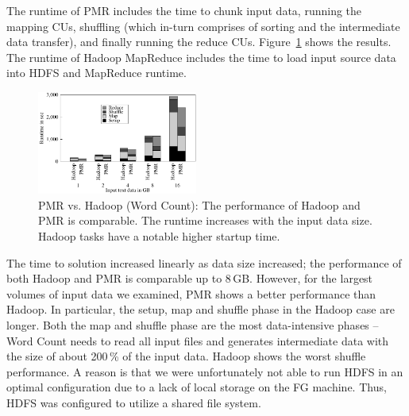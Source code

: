 \documentclass{acm_proc_article-sp}
\newcommand{\jhanote}[1]{ {\textcolor{red} { ***SJ: #1 }}}
\newcommand{\alnote}[1]{ {\textcolor{blue} { ***andreL: #1 }}}
\newcommand{\pnote}[1]{ {\textcolor{magenta} { ***pradeep: #1 }}}
\newcommand{\alnote}[1]{}
\newcommand{\pnote}[1]{}
\newcommand{\jhanote}[1]{}
\newcommand{\upp}{\vspace*{-0.5em}}
\begin{document}
The runtime of PMR includes the time to chunk input data, running the
mapping CUs, shuffling (which in-turn comprises of sorting and the
intermediate data transfer), and finally running the reduce CUs.
Figure~\ref{fig:figures_wc_pmr_hmr} shows the results. The runtime of
Hadoop MapReduce includes the time to load input source data into HDFS and
MapReduce runtime.

\begin{figure}[ht]
	\centering
		\includegraphics[width=0.47\textwidth]{figures/wc_pmr_hmr.pdf}
                \caption{PMR vs. Hadoop (Word Count): The performance
                  of Hadoop and PMR is comparable. The runtime 
                  increases with the input data size. Hadoop tasks
                  have a notable higher startup time.\upp}
\label{fig:figures_wc_pmr_hmr}
\end{figure}		
	
The time to solution increased linearly as data size increased; the performance
of both Hadoop and PMR is comparable up to 8\,GB. However, for the largest
volumes of input data we examined, PMR shows a better performance than Hadoop.
In particular, the setup, map and shuffle phase in the Hadoop case are longer.
Both the map and shuffle phase are the most data-intensive phases -- Word Count
needs to read all input files and generates intermediate data with the size of
about 200\,\% of the input data. Hadoop shows the worst shuffle performance. A
reason is that we were unfortunately not able to run HDFS in an optimal
configuration due to a lack of local storage on the FG machine. Thus, HDFS was
configured to utilize a shared file system.
  

\end{document}
